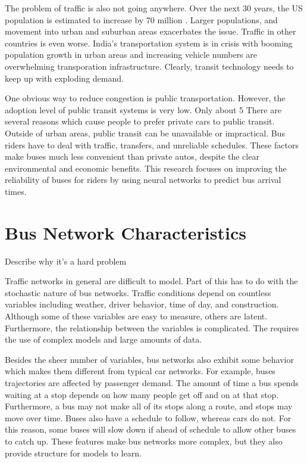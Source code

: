 
The problem of traffic is also not going anywhere.
Over the next 30 years, the US population is estimated to increase by 70 million \cite{traffic}.
Larger populations, and movement into urban and suburban areas exacerbates the issue.
Traffic in other countries is even worse.
India's transportation system is in crisis with booming population growth in urban areas and increasing vehicle numbers are overwhelming transporation infrastructure.
Clearly, transit technology needs to keep up with exploding demand.


One obvious way to reduce congestion is public transportation.
However, the adoption level of public transit systems is very low.
Only about 5%
There are several reasons which cause people to prefer private cars to public transit.
Outside of urban areas, public transit can be unavailable or impractical.
Bus riders have to deal with traffic, transfers, and unreliable schedules.
These factors make buses much less convenient than private autos, despite the clear environmental and economic benefits.
This research focuses on improving the reliability of buses for riders by using neural networks to predict bus arrival times.


\section{Bus Network Characteristics}
Describe why it's a hard problem


Traffic networks in general are difficult to model.
Part of this has to do with the stochastic nature of bus networks.
Traffic conditions depend on countless variables including weather, driver behavior, time of day, and construction.
Although some of these variables are easy to measure, others are latent.
Furthermore, the relationship between the variables is complicated.
The requires the use of complex models and large amounts of data.


Besides the sheer number of variables, bus networks also exhibit some behavior which makes them different from typical car networks.
For example, buses trajectories are affected by passenger demand.
The amount of time a bus spends waiting at a stop depends on how many people get off and on at that stop.
Furthermore, a bus may not make all of its stops along a route, and stops may move over time.
Buses also have a schedule to follow, whereas cars do not.
For this reason, some buses will slow down if ahead of schedule to allow other buses to catch up.
These features make bus networks more complex, but they also provide structure for models to learn.


